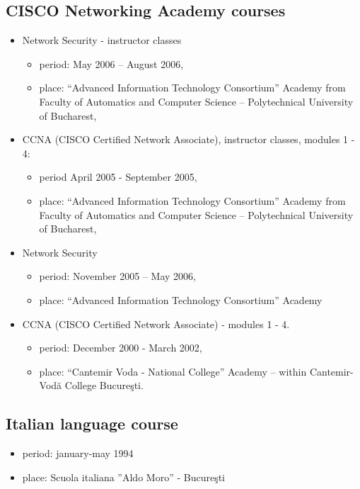 \documentclass[a4paper,12pt,openany]{article}
\begin{document}
	\subsection{CISCO Networking Academy courses}
		\begin{itemize}
			\item Network Security - instructor classes
			\begin{itemize}
			 	\item period: May 2006 – August 2006,
				\item place: “Advanced Information Technology Consortium” Academy from Faculty of Automatics and Computer Science – Polytechnical University of Bucharest,
			\end{itemize}

			\item CCNA (CISCO Certified Network Associate), instructor classes, modules 1 - 4:
			\begin{itemize}
 				\item period April 2005 - September 2005,
				\item place: “Advanced Information Technology Consortium” Academy from Faculty of Automatics and Computer Science – Polytechnical University of Bucharest,
			\end{itemize}

			\item Network Security
			\begin{itemize}
				\item period: November 2005 – May 2006,
				\item place: “Advanced Information Technology Consortium” Academy
			\end{itemize}
			
			\item CCNA  (CISCO Certified Network Associate) - modules 1 - 4. 
			\begin{itemize}
				\item period: December 2000 - March 2002,
				\item place: “Cantemir Voda - National College”  Academy – within Cantemir-Vodă College Bucureşti.                                     
			\end{itemize}			
			
		\end{itemize}
	\subsection{Italian language course}
		\begin{itemize}
		 	\item period: january-may 1994
			\item place: Scuola italiana ”Aldo Moro” - Bucureşti
		\end{itemize}
\end{document}
